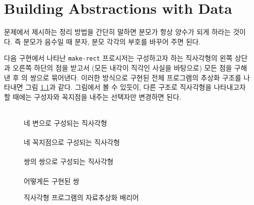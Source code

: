 \chapter{\Large{Building Abstractions with Data}}


문제에서 제시하는 정리 방법을 간단히 말하면 분모가 항상 양수가 되게 하라는
것이다. 즉 분모가 음수일 때 분자, 분모 각각의 부호를 바꾸어 주면 된다.





다음 구현에서 나타난 \texttt{make-rect} 프로시저는 구성하고자 하는 직사각형의
왼쪽 상단과 오른쪽 하단의 점을 받고서
(모든 내각이 직각인 사실을 바탕으로) 모든 점을 구해낸 후 의 쌍으로
묶어낸다. 이러한 방식으로 구현된 전체 프로그램의 추상화 구조를 나타내면 그림
\ref{fig:absrect}과 같다. 그림에서 볼 수 있듯이, 다른 구조로 직사각형을
나타내고자 할 때에는 구성자와 꼭지점을 내주는 선택자만 변경하면 된다.
\begin{figure}[t]
  \centering
  \HR{2em}\HR{2em}\vspace{1em}\\
  네 변으로 구성되는 직사각형 \vspace{1em}\\
  \HR{4em}\HR{4em}\vspace{1em}\\
  네 꼭지점으로 구성되는 직사각형 \vspace{1em}\\
  \HR{3em}\HR{3em}\vspace{1em}\\
  쌍의 쌍으로 구성되는 직사각형 \vspace{1em}\\
  \HR{11em}\HR{11em}\vspace{1em}\\
  어떻게든 구현된 쌍\vspace{1em}\\
  \caption{직사각형 프로그램의 자료추상화 배리어}
  \label{fig:absrect}
\end{figure}




